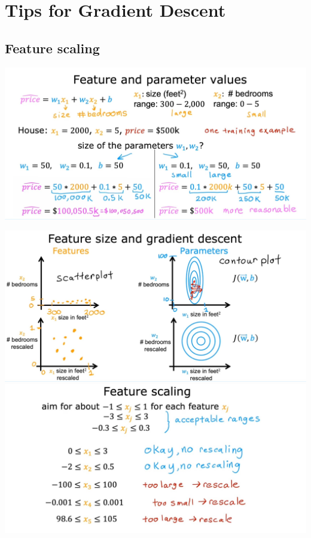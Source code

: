 \chapter{Tips for Gradient Descent}
\section{Feature scaling}
\noindent
\includegraphics*[width=\textwidth]{images/2.4 (8)}

\vspace{2em}

\noindent
\includegraphics*[width=\textwidth]{images/2.4 (7)}
\noindent
\includegraphics*[width=\textwidth]{images/2.4 (4)}

